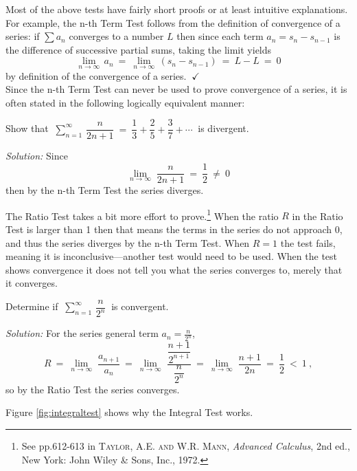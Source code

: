 \newpage
Most of the above tests have fairly short proofs or at least
intuitive explanations. For example, the n-th Term Test follows from the
definition of convergence of a series: if $\sum a_n$ converges to a number $L$
then since each term $a_n = s_n - s_{n-1}$ is the difference of successive
partial sums, taking the limit yields
\[
\lim_{n \to \infty} \,a_n ~=~ \lim_{n \to \infty} \,(s_n - s_{n-1}) ~=~ L - L ~=~ 0
\]
by definition of the convergence of a series. $~\checkmark$\\Since the n-th
Term Test can never be used to prove convergence of a series, it is often stated
in the following logically equivalent manner:


\begin{exmp}
\noindent Show that $~\displaystyle\sum_{n=1}^{\infty} \,\dfrac{n}{2n+1} ~=~
\dfrac{1}{3} + \dfrac{2}{5} + \dfrac{3}{7} + \cdots~$ is
divergent.\vspace{1mm}
\par\noindent\emph{Solution:} Since
\[
\lim_{n \to \infty} \;\frac{n}{2n+1} ~=~ \frac{1}{2} ~\ne ~ 0
\]
then by the n-th Term Test the series diverges.
\end{exmp}
\divider
\vspace{2mm}

The Ratio Test takes a bit more effort to
prove.\footnote{See pp.612-613 in \textsc{Taylor, A.E. and W.R. Mann},
\emph{Advanced Calculus}, 2nd ed., New York: John Wiley \& Sons, Inc., 1972.}
When the ratio $R$ in the Ratio Test is larger than 1 then that means the terms
in the series do not approach 0, and thus the series diverges by the n-th Term
Test. When $R=1$ the test fails, meaning it is inconclusive---another test would
need to be used. When the test shows convergence it does not tell you what the
series converges to, merely that it converges.

\begin{exmp}
\noindent Determine if $~\displaystyle\sum_{n=1}^{\infty} \,\dfrac{n}{2^n}~$ is
convergent.\vspace{1mm}
\par\noindent\emph{Solution:} For the series general term $a_n = \frac{n}{2^n}$,
\[
R ~=~ \lim_{n \to \infty} \;\frac{a_{n+1}}{a_n} ~=~
\lim_{n \to \infty} \;\dfrac{\dfrac{n+1}{2^{n+1}}}{\dfrac{n}{2^n}} ~=~
\lim_{n \to \infty} \;\dfrac{n+1}{2n} ~=~ \frac{1}{2} ~<~ 1 ~,
\]
so by the Ratio Test the series converges.
\end{exmp}
\divider
\newpage
Figure \ref{fig:integraltest} shows why the Integral Test works.

